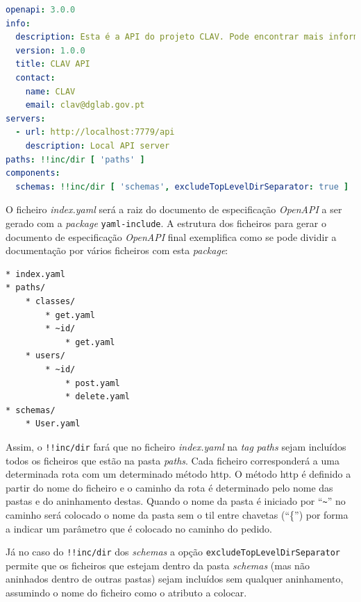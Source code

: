\begin{lstlisting}[language=yaml, caption=Exemplo de uso do \texttt{yaml-include} no documento de especificação \textit{OpenAPI}(\textit{index.yaml}), label=exem:yamli]
openapi: 3.0.0
info:
  description: Esta é a API do projeto CLAV. Pode encontrar mais informação sobre o CLAV em [http://clav.dglab.gov.pt](http://clav.dglab.gov.pt).
  version: 1.0.0
  title: CLAV API
  contact:
    name: CLAV
    email: clav@dglab.gov.pt
servers:
  - url: http://localhost:7779/api
    description: Local API server
paths: !!inc/dir [ 'paths' ]
components:
  schemas: !!inc/dir [ 'schemas', excludeTopLevelDirSeparator: true ]
\end{lstlisting}

O ficheiro \textit{index.yaml} será a raiz do documento de especificação \textit{OpenAPI} a ser gerado com a \textit{package} \texttt{yaml-include}. A estrutura dos ficheiros para gerar o documento de especificação \textit{OpenAPI} final exemplifica como se pode dividir a documentação por vários ficheiros com esta \textit{package}:
\begin{lstlisting}[language=pseudocode, caption=Exemplo de estrutura dos ficheiros para gerar o documento de especificação \textit{OpenAPI}, label=exem:faf]
* index.yaml
* paths/
    * classes/
        * get.yaml
        * ~id/
            * get.yaml
    * users/
        * ~id/
            * post.yaml
            * delete.yaml
* schemas/
    * User.yaml
\end{lstlisting}

Assim, o \texttt{!!inc/dir} fará que no ficheiro \textit{index.yaml} na \textit{tag} \textit{paths} sejam incluídos todos os ficheiros que estão na pasta \textit{paths}. Cada ficheiro corresponderá a uma determinada rota com um determinado método \acrshort{http}. O método \acrshort{http} é definido a partir do nome do ficheiro e o caminho da rota é determinado pelo nome das pastas e do aninhamento destas. Quando o nome da pasta é iniciado por ``\verb|~|'' no caminho será colocado o nome da pasta sem o til entre chavetas (``\{'') por forma a indicar um parâmetro que é colocado no caminho do pedido.

Já no caso do \texttt{!!inc/dir} dos \textit{schemas} a opção \texttt{excludeTopLevelDirSeparator} permite que os ficheiros que estejam dentro da pasta \textit{schemas} (mas não aninhados dentro de outras pastas) sejam incluídos sem qualquer aninhamento, assumindo o nome do ficheiro como o atributo a colocar.

